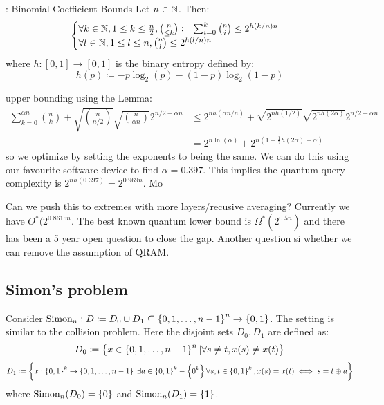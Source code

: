 \begin{enumerate}
    \begin{lembox}{: Binomial Coefficient Bounds}
        Let $n \in \mathbb{N}$. Then:
        \begin{equation}
            \begin{cases}
                \forall k \in \mathbb{N}, 1 \leq k \leq \frac{n}{2}, \binom{n}{\leq k} \coloneqq \sum_{i=0}^k \binom{n}{i} \leq 2^{h(k/n)n}
                \\ \forall l \in \mathbb{N}, 1 \leq l \leq n, \binom{n}{l} \leq 2^{h(l/n)n}
            \end{cases}
        \end{equation}
        where $h:[0, 1] \to [0, 1]$ is the binary entropy defined by:
        \begin{equation}
            h(p) \coloneqq -p\log_2(p) - (1-p)\log_2(1-p)
        \end{equation}
    \end{lembox}
    upper bounding using the Lemma:
    \begin{align}
        \sum_{k=0}^{\alpha n}\binom{n}{k} + \sqrt{\binom{n}{n/2}}\sqrt{\binom{n}{\alpha n}}2^{n/2-\alpha n} &\leq 2^{nh(\alpha n/n)} + \sqrt{2^{nh(1/2)}}\sqrt{2^{nh(2\alpha)}} 2^{n/2-\alpha n}
        \\ &= 2^{n\ln(\alpha)} + 2^{n(1 + \frac{1}{2}h(2\alpha) - \alpha)}
    \end{align}
    so we optimize by setting the exponents to being the same. We can do this using our favourite software device to find $\alpha = 0.397$. This implies the quantum query complexity is $2^{nh(0.397)} = 2^{0.969n}$. Mo

    Can we push this to extremes with more layers/recusive averaging? Currently we have $O^*(2^{0.8615n}$. The best known quantum lower bound is $\Omega^*(2^{0.5n})$ and there has been a 5 year open question to close the gap. Another question si whether we can remove the assumption of QRAM. 

\end{enumerate}


\subsection*{Simon's problem}
Consider $\text{Simon}_n : D \coloneqq D_0 \cup D_1 \subseteq \set{0, 1, \ldots, n-1}^n \to \set{0, 1}$. The setting is similar to the collision problem. Here the disjoint sets $D_0, D_1$ are defined as:
\begin{equation}
    D_0 \coloneqq \set{x \in \set{0, 1, \ldots, n-1}^n \vert \forall s \neq t, x(s) \neq x(t)}
\end{equation}
\begin{equation}
     D_1 \coloneqq \set{x: \set{0, 1}^k \to \set{0,1, \ldots, n-1} \vert \exists a \in \set{0, 1}^k - \set{0^k} \forall s, t \in \set{0, 1}^k, x(s) = x(t) \iff s = t \oplus a}
\end{equation}
where $\text{Simon}_n(D_0) = \set{0}$ and $\text{Simon}_n(D_1) = \set{1}$. 

